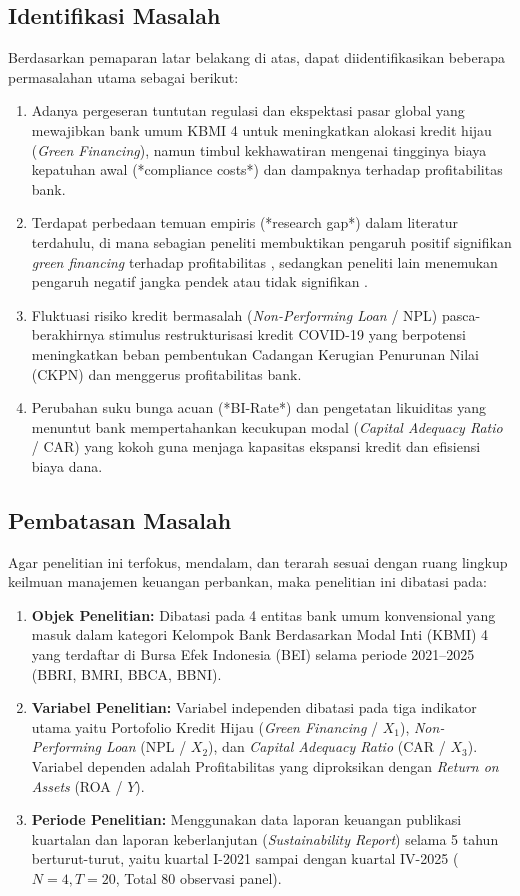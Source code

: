 \documentclass[12pt,a4paper]{article}
\numberwithin{equation}{section}
\begin{document}
\subsection{Identifikasi Masalah}

\noindent
Berdasarkan pemaparan latar belakang di atas, dapat diidentifikasikan beberapa permasalahan utama sebagai berikut:
\begin{enumerate}
  \item Adanya pergeseran tuntutan regulasi dan ekspektasi pasar global yang mewajibkan bank umum KBMI 4 untuk meningkatkan alokasi kredit hijau (\emph{Green Financing}), namun timbul kekhawatiran mengenai tingginya biaya kepatuhan awal (*compliance costs*) dan dampaknya terhadap profitabilitas bank.
  \item Terdapat perbedaan temuan empiris (*research gap*) dalam literatur terdahulu, di mana sebagian peneliti membuktikan pengaruh positif signifikan \emph{green financing} terhadap profitabilitas \citep{Pramono2022, Yin2021, SariAstuti2023}, sedangkan peneliti lain menemukan pengaruh negatif jangka pendek atau tidak signifikan \citep{Akomea2022, Zhang2022}.
  \item Fluktuasi risiko kredit bermasalah (\emph{Non-Performing Loan} / NPL) pasca-berakhirnya stimulus restrukturisasi kredit COVID-19 yang berpotensi meningkatkan beban pembentukan Cadangan Kerugian Penurunan Nilai (CKPN) dan menggerus profitabilitas bank.
  \item Perubahan suku bunga acuan (*BI-Rate*) dan pengetatan likuiditas yang menuntut bank mempertahankan kecukupan modal (\emph{Capital Adequacy Ratio} / CAR) yang kokoh guna menjaga kapasitas ekspansi kredit dan efisiensi biaya dana.
\end{enumerate}

\subsection{Pembatasan Masalah}

\noindent
Agar penelitian ini terfokus, mendalam, dan terarah sesuai dengan ruang lingkup keilmuan manajemen keuangan perbankan, maka penelitian ini dibatasi pada:
\begin{enumerate}
  \item \textbf{Objek Penelitian:} Dibatasi pada 4 entitas bank umum konvensional yang masuk dalam kategori Kelompok Bank Berdasarkan Modal Inti (KBMI) 4 yang terdaftar di Bursa Efek Indonesia (BEI) selama periode 2021--2025 (BBRI, BMRI, BBCA, BBNI).
  \item \textbf{Variabel Penelitian:} Variabel independen dibatasi pada tiga indikator utama yaitu Portofolio Kredit Hijau (\emph{Green Financing} / $X_1$), \emph{Non-Performing Loan} (NPL / $X_2$), dan \emph{Capital Adequacy Ratio} (CAR / $X_3$). Variabel dependen adalah Profitabilitas yang diproksikan dengan \emph{Return on Assets} (ROA / $Y$).
  \item \textbf{Periode Penelitian:} Menggunakan data laporan keuangan publikasi kuartalan dan laporan keberlanjutan (\emph{Sustainability Report}) selama 5 tahun berturut-turut, yaitu kuartal I-2021 sampai dengan kuartal IV-2025 ($N=4, T=20$, Total 80 observasi panel).
\end{enumerate}
\end{document}
